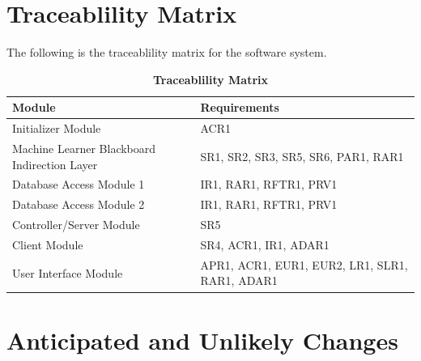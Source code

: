 \documentclass[12pt, titlepage]{article}
\begin{document}
\section{Traceablility Matrix}
The following is the traceablility matrix for the software system.
\begin{longtable}{|p{4cm}|p{4cm}|}
  \caption{\bf Traceablility Matrix}\\
           \hline
           \bf Module & \bf Requirements\\
           \hline
           Initializer Module & ACR1\\
           \hline
           Machine Learner Blackboard Indirection Layer & SR1, SR2, SR3, SR5, SR6, PAR1, RAR1\\
           \hline 
           Database Access Module 1 & IR1, RAR1, RFTR1, PRV1\\
           \hline 
           Database Access Module 2 & IR1, RAR1, RFTR1, PRV1\\
           \hline 
           Controller/Server Module & SR5\\
           \hline 
           Client Module & SR4, ACR1, IR1, ADAR1\\
           \hline 
           User Interface Module & APR1, ACR1, EUR1, EUR2, LR1, SLR1, RAR1, ADAR1\\
           \hline 
  \end{longtable}

\section{Anticipated and Unlikely Changes}
\end{document}
